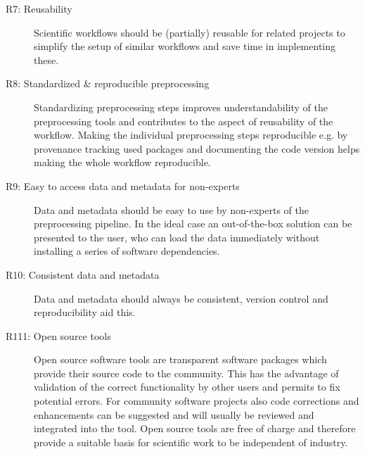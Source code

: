 \begin{description}
 \item[R7: Reusability] Scientific workflows should be (partially) reusable for related projects to simplify the setup of similar workflows and save time in implementing these.
 \item[R8: Standardized \& reproducible preprocessing] Standardizing preprocessing steps improves understandability of the preprocessing tools and contributes to the aspect of reusability of the workflow. Making the individual preprocessing steps reproducible e.g. by provenance tracking used packages and documenting the code version helps making the whole workflow reproducible.
 \item[R9: Easy to access data and metadata for non-experts] Data and metadata should be easy to use by non-experts of the preprocessing pipeline. In the ideal case an out-of-the-box solution can be presented to the user, who can load the data immediately without installing a series of software dependencies. 
 \item[R10: Consistent data and metadata] Data and metadata should always be consistent, version control and reproducibility aid this.
 \item[R111: Open source tools] Open source software tools are transparent software packages which provide their source code to the community. This has the advantage of validation of the correct functionality by other users and permits to fix potential errors. For community software projects also code corrections and enhancements can be suggested and will usually be reviewed and integrated into the tool. Open source tools are free of charge and therefore provide a suitable basis for scientific work to be independent of industry.
\end{description}


